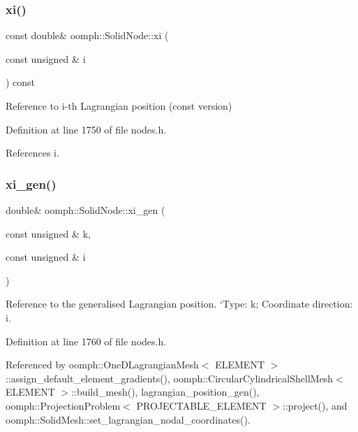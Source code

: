 \subsubsection{\texorpdfstring{xi()}{xi()}\hspace{0.1cm}{\footnotesize\ttfamily [2/2]}}
{\footnotesize\ttfamily const double\& oomph\+::\+Solid\+Node\+::xi (\begin{DoxyParamCaption}\item[{const unsigned \&}]{i }\end{DoxyParamCaption}) const\hspace{0.3cm}{\ttfamily [inline]}}



Reference to i-\/th Lagrangian position (const version) 



Definition at line 1750 of file nodes.\+h.



References i.

\mbox{\label{classoomph_1_1SolidNode_a409f7536f7d47c7900be8d0fa06c17cd}} 
\subsubsection{\texorpdfstring{xi\+\_\+gen()}{xi\_gen()}\hspace{0.1cm}{\footnotesize\ttfamily [1/2]}}
{\footnotesize\ttfamily double\& oomph\+::\+Solid\+Node\+::xi\+\_\+gen (\begin{DoxyParamCaption}\item[{const unsigned \&}]{k,  }\item[{const unsigned \&}]{i }\end{DoxyParamCaption})\hspace{0.3cm}{\ttfamily [inline]}}



Reference to the generalised Lagrangian position. `\+Type\textquotesingle{}\+: k; \textquotesingle{}Coordinate direction\+: i. 



Definition at line 1760 of file nodes.\+h.



Referenced by oomph\+::\+One\+D\+Lagrangian\+Mesh$<$ E\+L\+E\+M\+E\+N\+T $>$\+::assign\+\_\+default\+\_\+element\+\_\+gradients(), oomph\+::\+Circular\+Cylindrical\+Shell\+Mesh$<$ E\+L\+E\+M\+E\+N\+T $>$\+::build\+\_\+mesh(), lagrangian\+\_\+position\+\_\+gen(), oomph\+::\+Projection\+Problem$<$ P\+R\+O\+J\+E\+C\+T\+A\+B\+L\+E\+\_\+\+E\+L\+E\+M\+E\+N\+T $>$\+::project(), and oomph\+::\+Solid\+Mesh\+::set\+\_\+lagrangian\+\_\+nodal\+\_\+coordinates().

